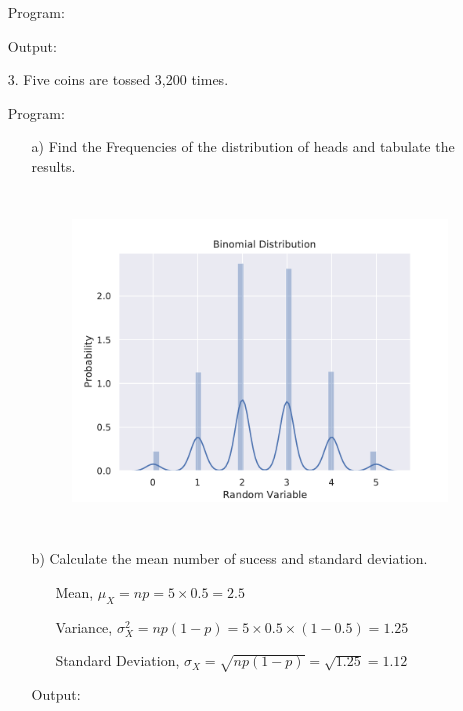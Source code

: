 \documentclass[a4paper,11pt,openright]{report}
\begin{document}
\begin{enumerate}
Program: 


Output:


\item[3.] Five coins are tossed 3,200 times.

Program:
 \begin{enumerate}

\pagebreak

\item[a)] Find the Frequencies of the distribution of heads and tabulate the results.



\begin{figure}[ht!]
\includegraphics[width=18cm,height=9cm,keepaspectratio]{binormdistplot.pdf}
\centering
\end{figure}

\vspace{2cm}

\item[b)] Calculate the mean number of sucess and standard deviation.
		\begin{enumerate}
				\item[ ] Mean, $\mu_{X} = np = 5 \times 0.5 = 2.5$
				\item[ ] Variance, $\sigma^{2}_{X} = np(1-p) = 5 \times 0.5 \times (1-0.5) = 1.25$
				\item[ ] Standard Deviation, $\sigma_{X} = \sqrt{np(1-p)} = \sqrt{1.25} = 1.12$
		\end{enumerate}

Output:



\end{enumerate}

\end{enumerate}
\end{document}
